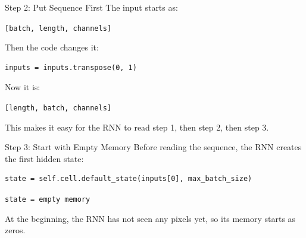 \documentclass{beamer}
\begin{document}
\begin{frame}[fragile]{Step 2: Put Sequence First}
\small
The input starts as:

\vspace{0.15cm}

\begin{center}
\texttt{[batch, length, channels]}
\end{center}

\vspace{0.15cm}

Then the code changes it:

\begin{verbatim}
inputs = inputs.transpose(0, 1)
\end{verbatim}

\vspace{0.15cm}

Now it is:

\begin{center}
\texttt{[length, batch, channels]}
\end{center}

This makes it easy for the RNN to read step 1, then step 2, then step 3.
\end{frame}

\begin{frame}[fragile]{Step 3: Start with Empty Memory}
\small
Before reading the sequence, the RNN creates the first hidden state:

\vspace{0.15cm}

\begin{verbatim}
state = self.cell.default_state(inputs[0], max_batch_size)
\end{verbatim}

\vspace{0.2cm}

\begin{center}
\texttt{state = empty memory}
\end{center}

\vspace{0.2cm}

At the beginning, the RNN has not seen any pixels yet, so its memory starts as zeros.
\end{frame}
\end{document}

